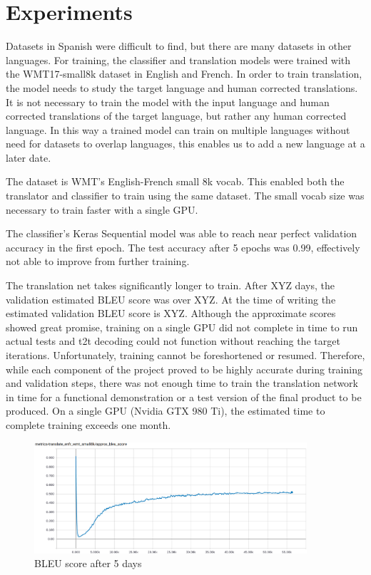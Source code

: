 \documentclass[10pt,a4paper]{article}
\begin{document}
\clearpage


\section{Experiments}


Datasets in Spanish were difficult to find, but there are many datasets in other languages. For training, the classifier and translation models were trained with the WMT17-small8k dataset in English and French. In order to train translation, the model needs to study the target language and human corrected translations. It is not necessary to train the model with the input language and human corrected translations of the target language, but rather any human corrected language. In this way a trained model can train on multiple languages without need for datasets to overlap languages, this enables us to add a new language at a later date.


The dataset is WMT's English-French small 8k vocab. This enabled both the translator and classifier to train using the same dataset. The small vocab size was necessary to train faster with a single GPU.


The classifier's Keras Sequential model was able to reach near perfect validation accuracy in the first epoch. The test accuracy after 5 epochs was 0.99, effectively not able to improve from further training.
  
The translation net takes significantly longer to train. After XYZ days, the validation estimated BLEU score was over XYZ. At the time of writing the estimated validation BLEU score is XYZ. Although the approximate scores showed great promise, training on a single GPU did not complete in time to run actual tests and t2t decoding could not function without reaching the target iterations. Unfortunately, training cannot be foreshortened or resumed. Therefore, while each component of the project proved to be highly accurate during training and validation steps, there was not enough time to train the translation network in time for a functional demonstration or a test version of the final product to be produced. On a single GPU (Nvidia GTX 980 Ti), the estimated time to complete training exceeds one month.


\begin{figure}[H]
  \begin{center}
    \includegraphics[width=0.9\textwidth] {BLEU.png}
    \caption{BLEU score after 5 days}
  \end{center}
\end{figure}
\end{document}
